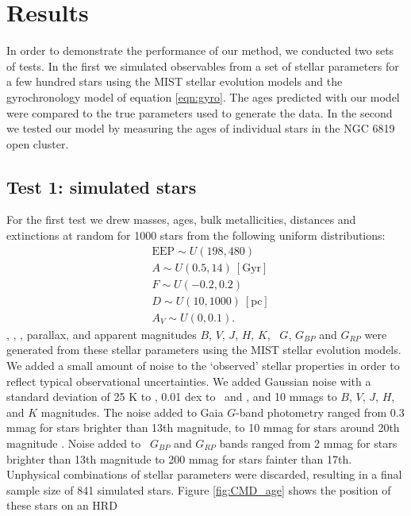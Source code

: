 \section{Results}
\label{section:results}

In order to demonstrate the performance of our method, we conducted two sets
of tests.
In the first we simulated observables from a set of stellar parameters for a
few hundred stars using the MIST stellar evolution models and the
gyrochronology model of equation \ref{eqn:gyro}.
The ages predicted with our model were compared to the true parameters used to
generate the data.
In the second we tested our model by measuring the ages of individual stars in
the NGC 6819 open cluster.

\subsection{Test 1: simulated stars}
For the first test we drew masses, ages, bulk metallicities, distances and
extinctions at random for 1000 stars from the following uniform distributions:
\begin{eqnarray}
& \mathrm{EEP} \sim U(198, 480) \\
& A \sim U(0.5, 14)\mathrm{~[Gyr]} \\
& F \sim U(-0.2, 0.2) \\
& D \sim U(10, 1000)~\mathrm{[pc]} \\
& A_V \sim U(0, 0.1).
\end{eqnarray}
\teff, \logg, \fhat, parallax, and apparent magnitudes $B$, $V$, $J$, $H$, $K$,
\gaia\ $G$, $G_{BP}$ and $G_{RP}$ were generated from these
stellar parameters using the MIST stellar evolution models.
We added a small amount of noise to the `observed' stellar properties in order
to reflect typical observational uncertainties.
We added Gaussian noise with a standard deviation of 25 K to \teff, 0.01 dex
to \feh\ and \logg, and 10 mmags to $B$, $V$, $J$, $H$, and $K$ magnitudes.
The noise added to Gaia $G$-band photometry ranged from
0.3 mmag for stars brighter than 13th magnitude, to 10 mmag for stars
around 20th magnitude \citep{evans2017, brown2018}.
Noise added to \gaia\ $G_{BP}$ and $G_{RP}$ bands ranged from 2 mmag for stars
brighter than 13th magnitude to 200 mmag for stars fainter than 17th.
Unphysical combinations of stellar parameters were discarded, resulting in a
final sample size of 841 simulated stars.
Figure \ref{fig:CMD_age} shows the position of these stars on an HRD
